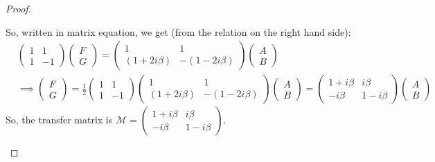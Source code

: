 \documentclass{article}
\begin{document}
\begin{proof}
\begin{itemize}
    So, written in matrix equation, we get (from the relation on the right hand side):
    \begin{align}
        &\begin{pmatrix}
            1&1\\1&-1
        \end{pmatrix}\begin{pmatrix}
            F\\G
        \end{pmatrix}=\begin{pmatrix}
            1&1\\(1+2i\beta)&-(1-2i\beta)
        \end{pmatrix}\begin{pmatrix}
            A\\B
        \end{pmatrix}\\
        &\implies \begin{pmatrix}
            F\\G
        \end{pmatrix}=\frac{1}{2}\begin{pmatrix}
            1&1\\1&-1
        \end{pmatrix}\begin{pmatrix}
            1&1\\(1+2i\beta)&-(1-2i\beta)
        \end{pmatrix}\begin{pmatrix}
            A\\B
        \end{pmatrix} = \begin{pmatrix}
            1+i\beta & i\beta\\-i\beta & 1-i\beta
        \end{pmatrix}\begin{pmatrix}
            A\\B
        \end{pmatrix}
    \end{align}
    So, the transfer matrix is $\mathcal{M}=\begin{pmatrix}
        1+i\beta & i\beta\\-i\beta & 1-i\beta
    \end{pmatrix}$.

    \hfil


\end{itemize}
\end{proof}
\end{document}
